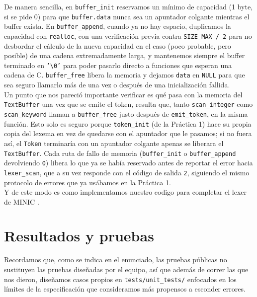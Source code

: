 \documentclass[12pt,letterpaper]{article}
\newcommand{\minic}{
  {M\footnotesize INI\normalsize C}
}
\begin{document}
\bigskip

De manera sencilla, en \texttt{buffer\_init} reservamos un mínimo de capacidad (1 byte, si se pide 0) para que
\texttt{buffer.data} nunca sea un apuntador colgante mientras el buffer exista. En \texttt{buffer\_append},
cuando ya no hay espacio, duplicamos la capacidad con \texttt{realloc}, con una verificación previa contra
\texttt{SIZE\_MAX / 2} para no desbordar el cálculo de la nueva capacidad en el caso (poco probable, pero
posible) de una cadena extremadamente larga, y mantenemos siempre el buffer terminado en
\texttt{'\textbackslash 0'} para poder pasarlo directo a funciones que esperan una cadena de C.
\texttt{buffer\_free} libera la memoria y dejamos \texttt{data} en \texttt{NULL} para que sea seguro llamarlo
más de una vez o después de una inicialización fallida.\\

Un punto que nos pareció importante verificar es qué pasa con la memoria del \texttt{TextBuffer} una vez que
se emite el token, resulta que, tanto \texttt{scan\_integer} como \texttt{scan\_keyword} llaman a
\texttt{buffer\_free} justo después de \texttt{emit\_token}, en la misma función. Esto solo es seguro porque
\texttt{token\_init} (de la Práctica 1) hace su propia copia del lexema en vez de quedarse con el apuntador que
le pasamos; si no fuera así, el \texttt{Token} terminaría con un apuntador colgante apenas se liberara el
\texttt{TextBuffer}. Cada ruta de fallo de memoria (\texttt{buffer\_init} o \texttt{buffer\_append} devolviendo
\texttt{0}) libera lo que ya se había reservado antes de reportar el error hacia \texttt{lexer\_scan}, que a
su vez responde con el código de salida \texttt{2}, siguiendo el mismo protocolo de errores que ya usábamos en
la Práctica 1.\\

Y de este modo es como implementamos nuestro codigo para completar el lexer de \minic.


\newpage

\section*{Resultados y pruebas}\label{sec:resultados}

Recordamos que, como se indica en el enunciado, las pruebas públicas no sustituyen las pruebas diseñadas por
el equipo, así que además de correr las que nos dieron, diseñamos casos propios en
\texttt{tests/unit\_tests/} enfocados en los límites de la especificación que consideramos más propensos a
esconder errores.
\end{document}
